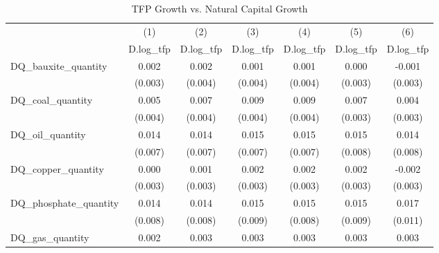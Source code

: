 \begin{table}[htbp]\centering
\def\sym#1{\ifmmode^{#1}\else\(^{#1}\)\fi}
\caption{TFP Growth vs. Natural Capital Growth}
\begin{tabular}{l*{6}{c}}
\hline\hline
            &\multicolumn{1}{c}{(1)}&\multicolumn{1}{c}{(2)}&\multicolumn{1}{c}{(3)}&\multicolumn{1}{c}{(4)}&\multicolumn{1}{c}{(5)}&\multicolumn{1}{c}{(6)}\\
            &\multicolumn{1}{c}{D.log\_tfp}&\multicolumn{1}{c}{D.log\_tfp}&\multicolumn{1}{c}{D.log\_tfp}&\multicolumn{1}{c}{D.log\_tfp}&\multicolumn{1}{c}{D.log\_tfp}&\multicolumn{1}{c}{D.log\_tfp}\\
\hline
DQ\_bauxite\_quantity&       0.002       &       0.002       &       0.001       &       0.001       &       0.000       &      -0.001       \\
            &     (0.003)       &     (0.004)       &     (0.004)       &     (0.004)       &     (0.003)       &     (0.003)       \\
[1em]
DQ\_coal\_quantity&       0.005       &       0.007       &       0.009       &       0.009       &       0.007       &       0.004       \\
            &     (0.004)       &     (0.004)       &     (0.004)       &     (0.004)       &     (0.003)       &     (0.003)       \\
[1em]
DQ\_oil\_quantity&       0.014       &       0.014       &       0.015       &       0.015       &       0.015       &       0.014       \\
            &     (0.007)       &     (0.007)       &     (0.007)       &     (0.007)       &     (0.008)       &     (0.008)       \\
[1em]
DQ\_copper\_quantity&       0.000       &       0.001       &       0.002       &       0.002       &       0.002       &      -0.002       \\
            &     (0.003)       &     (0.003)       &     (0.003)       &     (0.003)       &     (0.003)       &     (0.003)       \\
[1em]
DQ\_phosphate\_quantity&       0.014       &       0.014       &       0.015       &       0.015       &       0.015       &       0.017       \\
            &     (0.008)       &     (0.008)       &     (0.009)       &     (0.008)       &     (0.009)       &     (0.011)       \\
[1em]
DQ\_gas\_quantity&       0.002       &       0.003       &       0.003       &       0.003       &       0.003       &       0.003       \\

\end{tabular}
\end{table}
